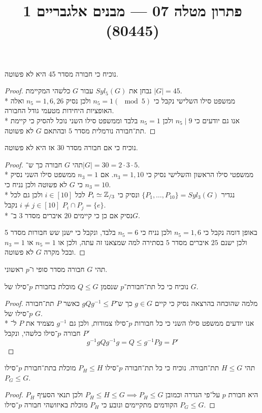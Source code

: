 
\title{פתרון מטלה 07 --- מבנים אלגבריים 1 (80445)}


\maketitle
\maketitleprint{}

\Question{}
\Subquestion{}
נוכיח כי חבורה מסדר 45 היא לא פשוטה.
\begin{proof}
	נבחן את $Syl_5(G)$ עבור $G$ כלשהי המקיימת $|G| = 45$. \\*
	ממשפט סילו השלישי נקבל כי $n_5 = 1 (\mod 5)$ ולכן נסיק $n_5 = 1, 6, 26$ ואלה האופציות היחידות מטעמי גודל החבורה. \\*
	אנו גם יודעים כי $n_5 \mid 9$ ולכן $n_5 = 1$ בלבד וממשפט סילו השני נוכל להסיק כי קיימת תת־חבורה נורמלית מסדר $5$ ובהתאם $G$ לא פשוטה.
\end{proof}

\Subquestion{}
נוכיח כי אם חבורה מסדר 30 אז היא לא פשוטה.
\begin{proof}
	תהי $G$ חבורה כך ש־$|G| = 30 = 2 \cdot 3 \cdot 5$. \\*
	ממשפטי סילו הראשון והשלישי נסיק כי $n_3 = 1, 10$. אם $n_3 = 1$ ממשפט סילו השני נסיק כי $G$ לא פשוטה ולכן נניח כי $n_3 = 10$. \\*
	נגדיר $\{ P_1, \dots, P_{10} \} = Syl_3(G)$ ונסיק כי $P_i \simeq \mathbb{Z}_{/3}$ לכל $i \in [10]$ ולכן גם לכל $i \ne j \in [10]$ נקבל $P_i \cap P_j = \{ e \}$. \\*
	נסיק אם כן כי קיימים $20$ איברים מסדר $3$ ב־$G$.

	באופן דומה נקבל כי $n_5 = 1, 6$ ולכן נניח כי $n_5 = 6$ בלבד, ונקבל כי ישנן שש חבורות מסדר 5 ולכן ישנם $25$ איברים מסדר $5$ בסתירה למה שמצאנו זה עתה, ולכן או $n_5 = 1$ או $n_3 = 1$ ובכל מקרה $G$ לא פשוטה.
\end{proof}

\Question{}
תהי $G$ חבורה מסדר סופי ו־$p$ ראשוני.

\Subquestion{}
נוכיח כי כל תת־חבורת־$p$ שנסמן $Q \le G$ מוכלת בחבורת $p$־סילו של $G$.
\begin{proof}
	מלמה שהוכחה בהרצאה נסיק כי קיים $g \in G$ כך ש־$g Q g^{-1} \le P$ כאשר $P$ תת־חבורה $p$־סילו של $G$. \\*
	אנו יודעים ממשפט סילו השני כי כל חבורות $p$־סילו צמודות, ולכן גם $g^{-1}$ מצמיד את $P$ ל־$P'$ חבורה $p$־סילו כלשהי, ונקבל
	\[
		g^{-1}g Q g^{-1}g = Q \le g^{-1} P g = P'
	\]
\end{proof}

\Subquestion{}
תהי $H \le G$ תת־חבורה. נוכיח כי כל תת־חבורה $p$־סילו $P_H \le H$ מוכלת בתת־חבורת $p$־סילו $P_G \le G$.
\begin{proof}
	$P_H$ היא חבורת $p$ על־פי הגדרה וכמובן $P_H \le H \le G \implies P_H \le G$ ולכן תנאי הסעיף הקודמים מתקיימים ונובע כי $P_H$ מוכלת באיזושהי חבורה $p$־סילו $P_G \le G$.
\end{proof}

